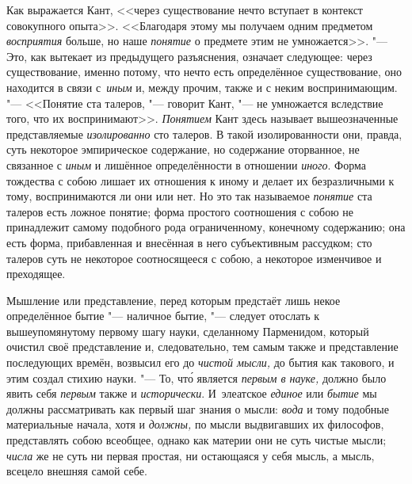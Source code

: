 Как выражается Кант, <<через существование нечто вступает в контекст
совокупного опыта>>. <<Благодаря этому мы получаем одним предметом
{\em восприятия} больше, но наше {\em понятие} о предмете этим не
умножается>>. "--- Это, как вытекает из
предыдущего разъяснения, означает следующее: через существование, именно
потому, что нечто есть определённое существование, оно находится в связи
с~{\em иным} и, между прочим, также и с неким воспринимающим. "--- <<Понятие
ста талеров, "--- говорит Кант, "--- не умножается вследствие того, что их
воспринимают>>. {\em Понятием} Кант здесь называет вышеозначенные
представляемые {\em изолированно} сто талеров. В такой изолированности они,
правда, суть некоторое эмпирическое содержание, но содержание оторванное, не
связанное с {\em иным} и лишённое определённости в отношении {\em иного}. Форма
тождества с собою лишает их отношения к иному и делает их безразличными к тому,
воспринимаются ли они или нет. Но это так называемое {\em понятие} ста талеров
есть ложное понятие; форма простого соотношения с собою не принадлежит самому
подобного рода ограниченному, конечному содержанию; она есть форма,
прибавленная и внесённая в него субъективным рассудком; сто талеров суть не
некоторое соотносящееся с собою, а некоторое изменчивое и преходящее.

Мышление или представление, перед которым предстаёт лишь некое определённое бытие
"--- наличное бытие, "--- следует отослать к вышеупомянутому первому шагу
науки, сделанному Парменидом, который очистил своё представление и,
следовательно, тем самым также и представление последующих времён, возвысил его
до {\em чистой мысли,} до бытия как такового, и этим создал стихию науки. "---
То, чт\'{о} является {\em первым в науке,} должно было явить себя {\em первым} также
и {\em исторически}. И~элеатское {\em единое} или {\em бытие} мы должны
рассматривать как первый шаг знания о мысли: {\em вода} и тому подобные материальные
начала, хотя и {\em должны,} по мысли выдвигавших их философов, представлять
собою всеобщее, однако как материи они не суть чистые мысли;
{\em числа} же не суть ни первая простая, ни остающаяся у себя мысль, а мысль,
всецело внешняя самой себе.

